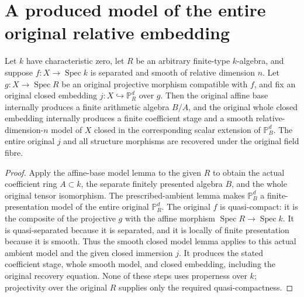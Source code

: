 \section{A produced model of the entire original relative embedding}

\begin{lemma}
\label{lem:kn-relative-arithmetic-original-projective-stage}
\leanok
Let $k$ have characteristic zero, let $R$ be an arbitrary finite-type
$k$-algebra, and suppose
$f:X\to\operatorname{Spec}k$ is separated and smooth of relative
dimension $n$.  Let $g:X\to\operatorname{Spec}R$ be an original
projective morphism compatible with $f$, and fix an original closed
embedding $j:X\hookrightarrow\mathbb P_R^d$ over $g$.
Then the original affine base internally produces a finite arithmetic
algebra $B/A$, and the original whole closed embedding internally
produces a finite coefficient stage and a smooth relative-dimension-$n$
model of $X$ closed in the corresponding scalar extension of
$\mathbb P_B^d$.  The entire original $j$ and all structure morphisms
are recovered under the original field fibre.
\end{lemma}
\begin{proof}
Apply the affine-base model lemma to the given $R$ to obtain the
actual coefficient ring $A\subset k$, the separate finitely
presented algebra $B$, and the whole original tensor isomorphism.
The prescribed-ambient lemma makes $\mathbb P_B^d$ a
finite-presentation model of the entire original $\mathbb P_R^d$.
The original $f$ is quasi-compact: it is the composite of the
projective $g$ with the affine morphism
$\operatorname{Spec}R\to\operatorname{Spec}k$.  It is
quasi-separated because it is separated, and it is locally of
finite presentation because it is smooth.  Thus the smooth closed
model lemma applies to this actual ambient model and the given
closed immersion $j$.  It produces the stated coefficient stage,
whole smooth model, and closed embedding, including the original
recovery equation.  None of these steps uses properness over $k$;
projectivity over the original $R$ supplies only the required
quasi-compactness.
\end{proof}
